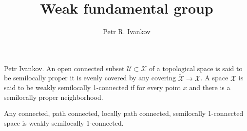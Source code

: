 \documentclass{beamer}
\title{Weak fundamental group}
\institute
{
Noncommutative geometry and topology
}
\author{Petr R. Ivankov  }
\theoremstyle{plain}
\newcommand{\sU}{\mathcal{U}}       %
\newcommand{\sX}{\mathcal{X}}       %
\begin{document}
\begin{frame}
  \titlepage
\end{frame}
\begin{frame}
\begin{definition}\label{top_weakly_semi1_defn}\alert{Petr Ivankov.}
		An open connected subset $\sU\subset \sX$ of a topological space is said to be \alert{semilocally proper} it is evenly covered by any covering $\widetilde{\sX}\to\sX$.
A space $\sX$ is said to be \alert{weakly semilocally 1-connected} if for  every point $x$ and there is a semilocally proper neighborhood.
\end{definition} 
\begin{example}
	Any connected, path connected, locally path connected, semilocally 1-connected   space is weakly semilocally 1-connected.
\end{example}

\end{frame}
\end{document}
